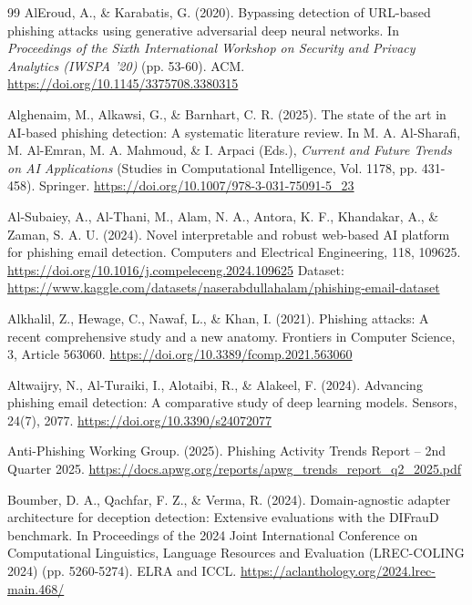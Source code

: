 \documentclass[11pt,a4paper,oneside]{report}
\begin{document}
\clearpage
{}
\begin{thebibliography}{99}
\small
\setlength{\itemsep}{3pt}
\setlength{\parsep}{0pt}
 AlEroud, A., \& Karabatis, G. (2020). Bypassing detection of URL-based phishing attacks using generative adversarial deep neural networks. In \emph{Proceedings of the Sixth International Workshop on Security and Privacy Analytics (IWSPA '20)} (pp. 53-60). ACM. \url{https://doi.org/10.1145/3375708.3380315}

 Alghenaim, M., Alkawsi, G., \& Barnhart, C. R. (2025). The state of the art in AI-based phishing detection: A systematic literature review. In M. A. Al-Sharafi, M. Al-Emran, M. A. Mahmoud, \& I. Arpaci (Eds.), \emph{Current and Future Trends on AI Applications} (Studies in Computational Intelligence, Vol. 1178, pp. 431-458). Springer. \url{https://doi.org/10.1007/978-3-031-75091-5_23}

 Al-Subaiey, A., Al-Thani, M., Alam, N. A., Antora, K. F., Khandakar, A., \& Zaman, S. A. U. (2024). Novel interpretable and robust web-based AI platform for phishing email detection. Computers and Electrical Engineering, 118, 109625. \url{https://doi.org/10.1016/j.compeleceng.2024.109625} Dataset: \url{https://www.kaggle.com/datasets/naserabdullahalam/phishing-email-dataset}

 Alkhalil, Z., Hewage, C., Nawaf, L., \& Khan, I. (2021). Phishing attacks: A recent comprehensive study and a new anatomy. Frontiers in Computer Science, 3, Article 563060. \url{https://doi.org/10.3389/fcomp.2021.563060}

 Altwaijry, N., Al-Turaiki, I., Alotaibi, R., \& Alakeel, F. (2024). Advancing phishing email detection: A comparative study of deep learning models. Sensors, 24(7), 2077. \url{https://doi.org/10.3390/s24072077}

 Anti-Phishing Working Group. (2025). Phishing Activity Trends Report -- 2nd Quarter 2025. \url{https://docs.apwg.org/reports/apwg_trends_report_q2_2025.pdf}

 Boumber, D. A., Qachfar, F. Z., \& Verma, R. (2024). Domain-agnostic adapter architecture for deception detection: Extensive evaluations with the DIFrauD benchmark. In Proceedings of the 2024 Joint International Conference on Computational Linguistics, Language Resources and Evaluation (LREC-COLING 2024) (pp. 5260-5274). ELRA and ICCL. \url{https://aclanthology.org/2024.lrec-main.468/}


\end{thebibliography}
\end{document}
